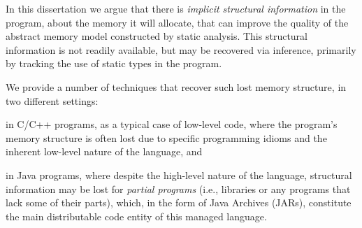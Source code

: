 In this dissertation we argue that there is \emph{implicit structural
  information} in the program, about the memory it will allocate, that
can improve the quality of the abstract memory model constructed by
static analysis. This structural information is not readily available,
but may be recovered via inference, primarily by tracking the use of
static types in the program.

We provide a number of techniques that recover such
lost memory structure, in two different settings:%
\begin{inparaenum}[(1)]
\item in C/C++ programs, as a typical case of low-level code, where
  the program's memory structure is often lost due to specific
  programming idioms and the inherent low-level nature of the
  language, and
\item in Java programs, where despite the high-level nature of the
  language, structural information may be lost for \emph{partial
    programs} (i.e., libraries or any programs that lack some of their
  parts), which, in the form of Java Archives (JARs), constitute the
  main distributable code entity of this managed language.
\end{inparaenum}


